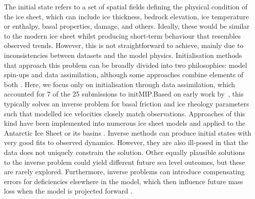\documentclass[journal abbreviation, manuscript]{copernicus}
\begin{document}
The initial state refers to a set of spatial fields defining the physical condition of the ice sheet, which can include ice thickness, bedrock elevation, ice temperature or enthalpy, basal properties, damage, and others. Ideally, these would be similar to the modern ice sheet whilst producing short-term behaviour that resembles observed trends. However, this is not straightforward to achieve, mainly due to inconsistencies between datasets and the model physics. Initialisation methods that approach this problem can be broadly divided into two philosophies: model spin-ups and data assimilation, although some approaches combine elements of both \citep{pollardSimpleInverseMethod2012,leclechRapidlyConvergingInitialisation2019}. Here, we focus only on initialisation through data assimilation, which accounted for 7 of the 25 submissions to initMIP.\@ Based on early work by~\cite{macayealBasalStressDistribution1992}, this typically solves an inverse problem for basal friction and ice rheology parameters such that modelled ice velocities closely match observations. Approaches of this kind have been implemented into numerous ice sheet models and applied to the Antarctic Ice Sheet or its basins \citep{morlighemInversionBasalFriction2013,gagliardiniCapabilitiesPerformanceElmer2013,cornfordCenturyscaleSimulationsResponse2015,arthernFlowSpeedAntarctic2015,hoffmanMPASAlbanyLandIce2018,rosierCalibratedSeaLevel2025}. Inverse methods can produce initial states with very good fits to observed dynamics. However, they are also ill-posed in that the data does not uniquely constrain the solution. Other equally plausible solutions to the inverse problem could yield different future sea level outcomes, but these are rarely explored. Furthermore, inverse problems can introduce compensating errors for deficiencies elsewhere in the model, which then influence future mass loss when the model is projected forward \citep{berendsCompensatingErrorsInversions2023}.
\end{document}
